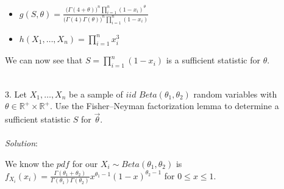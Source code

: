 \documentclass[12pt]{article}
\newcommand{\XB}{\color{black}}
\newcommand{\XBB}{\color{blue}}
\newcommand{\XV}{\color{violet}}
\begin{document}
\begin{itemize}
    \item $ \displaystyle g(S, \theta) = \frac{ \bigl( \Gamma(4 + \theta) \bigr)^{n} \prod_{i=1}^{n} (1 - x_{i})^{\theta}}{ \bigl( \Gamma(4)\Gamma(\theta) \bigr)^{n}\prod_{i=1}^{n} (1 - x_{i})} $
    \item $ \displaystyle h(X_{1}, \dots , X_{n}) = \prod_{i=1}^{n} x_{i}^{3} $
\end{itemize}

\noindent
We can now see that $ \displaystyle S = \prod_{i=1}^{n} (1 - x_{i}) $ is a sufficient statistic for $ \theta $.

\newpage
\XBB\hrulefill\XB \\

3. Let $ X_{1},\dots,X_{n} $ be a sample of $ iid $ $ Beta(\theta_{1}, \theta_{2}) $ random variables with $ \theta \in \mathbb{R}^{+} \times \mathbb{R}^{+} $.
Use the Fisher–Neyman factorization lemma to determine a sufficient statistic $ S $ for $ \overrightarrow{\theta} $. \\

\XBB\hrulefill\XB 
\vspace{5mm} \\


\textit{Solution}:
\vspace{2.5mm}

\noindent 
We know the $ pdf $ for our $ \displaystyle X_{i} \sim Beta(\theta_{1}, \theta_{2}) $ is $ \displaystyle f_{X_{i}}(x_{i}) = \frac{\Gamma(\theta_{1} + \theta_{2})}{\Gamma(\theta_{1})\Gamma(\theta_{2})}x^{\theta_{1} - 1}(1 - x)^{\theta_{2} - 1} $ for $ 0 \leq x \leq 1 $. \\
\end{document}
